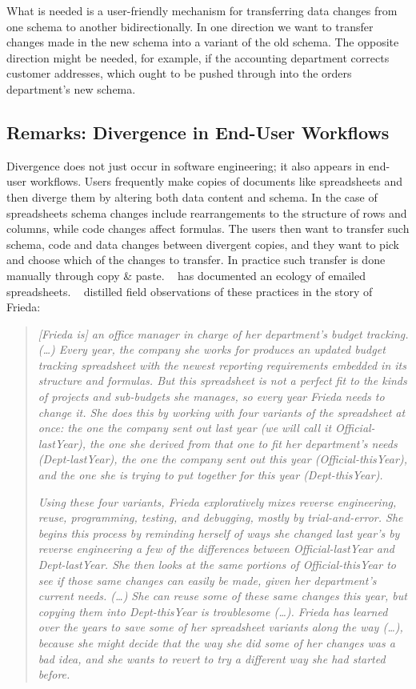 \documentclass[english,crc]{programming}
\newcommand{\citet}[1]{\citeauthor*{#1}~\cite{#1}}
\begin{document}
What is needed is a user-friendly mechanism for transferring data changes from one schema to
another bidirectionally. In one direction we want to transfer changes made in the new schema
into a variant of the old schema. The opposite direction might be needed, for example,
if the accounting department corrects customer addresses, which ought to be pushed
through into the orders department's new schema.

\subsection*{Remarks: Divergence in End-User Workflows}

Divergence does not just occur in software engineering; it also appears in end-user
workflows. Users frequently make copies of documents like spreadsheets and then
diverge them by altering both data content and schema. In the case of spreadsheets schema
changes include rearrangements to the structure of rows and columns, while code changes affect
formulas. The users then want to transfer such schema, code and data changes between
divergent copies, and they want to pick and choose which of the changes to transfer.
In practice such transfer is done manually through copy \& paste. \citet{Basman19} has
documented an ecology of emailed spreadsheets. \citet{Burnett14} distilled field observations
of these practices in the story of Frieda:

\begin{quotation}
\setlength{\parskip}{0.5em}
\setlength{\parindent}{0em}

\noindent
\emph{[Frieda is] an office manager in charge of her department's budget
tracking. (\ldots) Every year, the company she works for produces an updated budget tracking
spreadsheet with the newest reporting requirements embedded in its structure and formulas.
But this spreadsheet is not a perfect fit to the kinds of projects and sub-budgets she manages,
so every year Frieda needs to change it. She does this by working with four variants of the
spreadsheet at once: the one the company sent out last year (we will call it Official-lastYear),
the one she derived from that one to fit her department's needs (Dept-lastYear), the one the
company sent out this year (Official-thisYear), and the one she is trying to put together
for this year (Dept-thisYear).}

\emph{Using these four variants, Frieda exploratively mixes reverse engineering, reuse,
programming, testing, and debugging, mostly by trial-and-error. She begins this process by
reminding herself of ways she changed last year's by reverse engineering a few of the
differences between Official-lastYear and Dept-lastYear. She then looks at the same portions
of Official-thisYear to see if those same changes can easily be made, given her department's
current needs.
(\ldots)
She can reuse some of these same changes this year, but copying them into Dept-thisYear
is troublesome (\ldots). Frieda has learned over the years to
save some of her spreadsheet variants along the way (\ldots),
because she might decide that the way she did some of her changes was a bad idea, and she
wants to revert to try a different way she had started before.}
\end{quotation}
\end{document}
